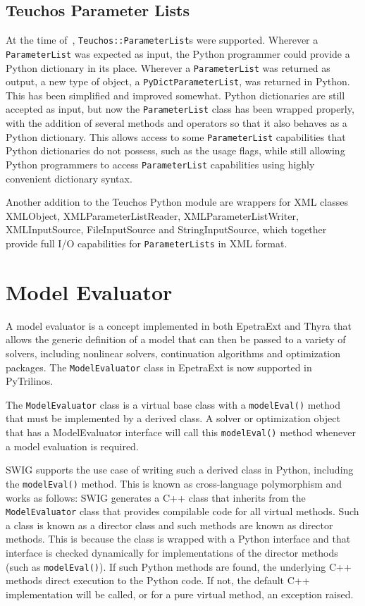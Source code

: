 \documentclass[11pt]{article}
\begin{document}
\subsection{Teuchos Parameter Lists}
\label{sec:teuchos_parameterlists}

At the time of~\cite{PyTrilinos}, {\tt Teuchos::ParameterList}s were supported.  Wherever a {\tt ParameterList} was expected as input, the Python programmer could provide a Python dictionary in its place.  Wherever a {\tt ParameterList} was returned as output, a new type of object, a {\tt PyDictParameterList}, was returned in Python.  This has been simplified and improved somewhat.  Python dictionaries are still accepted as input, but now the {\tt ParameterList} class has been wrapped properly, with the addition of several methods and operators so that it also behaves as a Python dictionary.  This allows access to some {\tt ParameterList} capabilities that Python dictionaries do not possess, such as the usage flags, while still allowing Python programmers to access {\tt ParameterList} capabilities using highly convenient dictionary syntax.

Another addition to the Teuchos Python module are wrappers for XML classes XMLObject, XMLParameterListReader, XMLParameterListWriter, XMLInputSource, FileInputSource and StringInputSource, which together provide full I/O capabilities for {\tt ParameterLists} in XML format.

\section{Model Evaluator}
\label{sec:modelevaluator}

A model evaluator is a concept implemented in both EpetraExt and Thyra that allows the generic definition of a model that can then be passed to a variety of solvers, including nonlinear solvers, continuation algorithms and optimization packages.  The {\tt ModelEvaluator} class in EpetraExt is now supported in PyTrilinos.

The {\tt ModelEvaluator} class is a virtual base class with a {\tt modelEval()} method that must be implemented by a derived class.  A solver or optimization object that has a ModelEvaluator interface will call this {\tt modelEval()} method whenever a model evaluation is required.

SWIG supports the use case of writing such a derived class in Python, including the {\tt modelEval()} method.  This is known as cross-language polymorphism and works as follows:  SWIG generates a C++ class that inherits from the {\tt ModelEvaluator} class that provides compilable code for all virtual methods.  Such a class is known as a director class and such methods are known as director methods.  This is because the class is wrapped with a Python interface and that interface is checked dynamically for implementations of the director methods (such as {\tt modelEval()}).  If such Python methods are found, the underlying C++ methods direct execution to the Python code.  If not, the default C++ implementation will be called, or for a pure virtual method, an exception raised.
\end{document}
